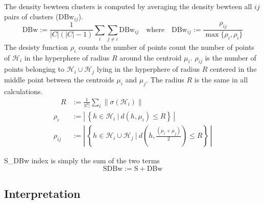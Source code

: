 The density bewteen clusters is computed by averaging the density bewteen all $ij$ pairs of clusters ($\textrm{DBw}_{ij}$).
\begin{equation*}
  \textrm{DBw} := \frac{1}{|C| (|C| - 1)} \sum_{i} \sum_{j \neq i} \textrm{DBw}_{ij}
  \quad \textrm{where} \quad
  \textrm{DBw}_{ij} := \frac{\rho_{ij}}{\max\{\rho_{i},\rho_{i}\}}
\end{equation*}
The desisty function $\rho_i$ counts the number of points count the number of points of $\mathcal{H}_i$ in the hyperphere of radius $R$ around the centroid $\mu_i$. $\rho_{ij}$ is the number of points belonging to $\mathcal{H}_i \cup \mathcal{H}_j$ lying in the hyperphere of radius $R$ centered in the middle point between the centroids $\mu_i$ and $\mu_j$. The radius $R$ is the same in all calculations.
\begin{align*}
  \quad R &:= \frac{1}{|\mathcal{C}|} \sum_i \| \sigma (\mathcal{H}_i)\| \\
  \rho_{i} &:= \left| \, \left\{ h \in \mathcal{H}_i \ | \ d(h, \mu_{i}) \le R \right\} \, \right| \\
  \rho_{ij} &:= \left| \, \left\{ h \in \mathcal{H}_i \cup \mathcal{H}_j \ | \
    d\left(h, \frac{\left(\mu_{i} + \mu_{j}\right)}{2}\right) \le R \right\} \, \right|
\end{align*}

S\_DBw index is simply the sum of the two terms
\begin{equation}
  \textrm{SDBw} := \textrm{S} + \textrm{DBw}
  \label{eq:sdbw}
\end{equation}

\subsection{Interpretation}

